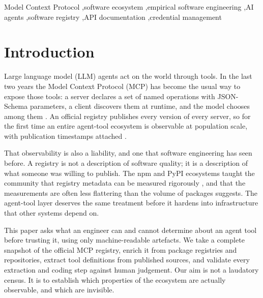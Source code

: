 \documentclass[a4paper,fleqn]{cas-dc}
\begin{document}
\begin{keywords}
Model Context Protocol \sep software ecosystem \sep empirical software engineering
\sep AI agents \sep software registry \sep API documentation \sep credential management
\end{keywords}

\maketitle

\section{Introduction}\label{sec:intro}

Large language model (LLM) agents act on the world through tools. In the last
two years the Model Context Protocol (MCP) has become the usual way to expose
those tools: a server declares a set of named operations with JSON-Schema
parameters, a client discovers them at runtime, and the model chooses among
them \citep{mcpspec}. An official registry publishes every version of every
server, so for the first time an entire agent-tool ecosystem is
observable at population scale, with publication timestamps attached
\citep{mcpregistry}.

That observability is also a liability, and one that software engineering has
seen before. A registry is not a description of software quality; it is a
description of what someone was willing to publish. The npm and PyPI
ecosystems taught the community that registry metadata can be measured
rigorously \citep{decan2019, abdalkareem2020}, and that the measurements are
often less flattering than the volume of packages suggests. The agent-tool
layer deserves the same treatment before it hardens into infrastructure that
other systems depend on.

This paper asks what an engineer can and cannot determine about an agent tool
before trusting it, using only machine-readable artefacts. We take a complete
snapshot of the official MCP registry, enrich it from package registries and
repositories, extract tool definitions from published sources, and validate
every extraction and coding step against human judgement. Our aim is not a
laudatory census. It is to establish which properties of the ecosystem are
actually observable, and which are invisible.
\end{document}
